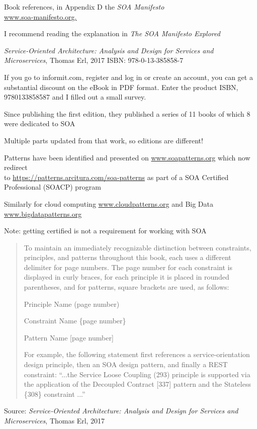 \documentclass[Screen16to9,17pt]{foils}
\begin{document}
Book references, in Appendix D the \emph{SOA Manifesto}\\
\url{www.soa-manifesto.org.}

I recommend reading the explanation in \emph{The SOA Manifesto Explored}




\emph{Service‑Oriented Architecture: Analysis and Design for Services and Microservices}, Thomas Erl, 2017
ISBN: 978-0-13-385858-7

If you go to informit.com,
register and log in or create an account, you can get a substantial discount on the eBook in PDF format. Enter the product ISBN, 9780133858587 and I filled out a small survey.



\begin{list2}
\item Since publishing the first edition, they published a series of 11 books of which 8 were dedicated to SOA
\item Multiple parts updated from that work, so editions are different!
\item Patterns have been identified and presented on \url{www.soapatterns.org} which now redirect\\
 to \url{https://patterns.arcitura.com/soa-patterns} as part of
a SOA Certified Professional (SOACP) program
\item Similarly for cloud computing \url{www.cloudpatterns.org} and Big
Data \url{www.bigdatapatterns.org}
\item Note: getting certified is not a requirement for working with SOA
\end{list2}




\begin{quote}
To maintain an immediately recognizable distinction between constraints, principles, and patterns throughout this book, each uses a different delimiter for page numbers. The page number for each constraint is displayed in curly braces, for each principle it is placed in rounded parentheses, and for patterns, square brackets are used, as follows:

\begin{list2}
\item Principle Name (page number)
\item Constraint Name \{page number\}
\item Pattern Name [page number]
\end{list2}
For example, the following statement first references a service-orientation design principle, then an SOA design pattern, and finally a REST constraint:
“...the Service Loose Coupling (293) principle is supported via the application of the Decoupled
Contract [337] pattern and the Stateless \{308\} constraint ...”
\end{quote}
Source: \emph{Service‑Oriented Architecture: Analysis and Design for Services and Microservices}, Thomas Erl, 2017
\end{document}
